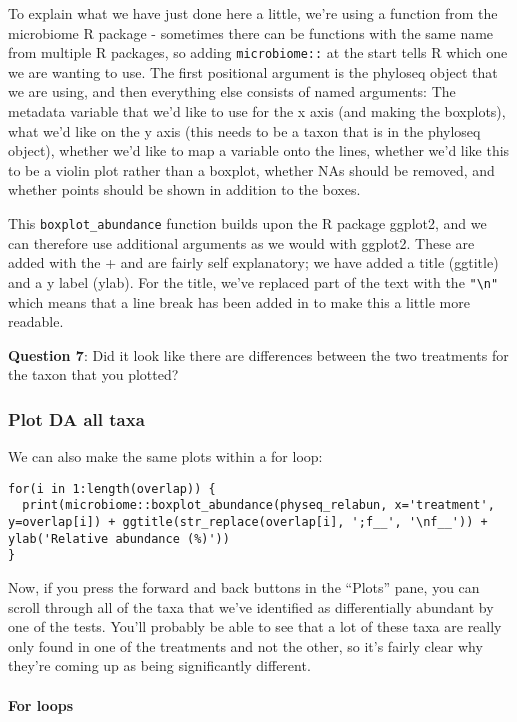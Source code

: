 \documentclass[
]{book}
\begin{document}
To explain what we have just done here a little, we're using a function from the microbiome R package - sometimes there can be functions with the same name from multiple R packages, so adding \texttt{microbiome::} at the start tells R which one we are wanting to use. The first positional argument is the phyloseq object that we are using, and then everything else consists of named arguments: The metadata variable that we'd like to use for the x axis (and making the boxplots), what we'd like on the y axis (this needs to be a taxon that is in the phyloseq object), whether we'd like to map a variable onto the lines, whether we'd like this to be a violin plot rather than a boxplot, whether NAs should be removed, and whether points should be shown in addition to the boxes.

This \texttt{boxplot\_abundance} function builds upon the R package ggplot2, and we can therefore use additional arguments as we would with ggplot2. These are added with the + and are fairly self explanatory; we have added a title (ggtitle) and a y label (ylab). For the title, we've replaced part of the text with the \texttt{"\textbackslash{}n"} which means that a line break has been added in to make this a little more readable.

\textbf{Question 7}: Did it look like there are differences between the two treatments for the taxon that you plotted?

\subsubsection{Plot DA all taxa}\label{plot-da-all-taxa}

We can also make the same plots within a for loop:

\begin{verbatim}
for(i in 1:length(overlap)) {
  print(microbiome::boxplot_abundance(physeq_relabun, x='treatment', y=overlap[i]) + ggtitle(str_replace(overlap[i], ';f__', '\nf__')) + ylab('Relative abundance (%)'))
}
\end{verbatim}

Now, if you press the forward and back buttons in the ``Plots'' pane, you can scroll through all of the taxa that we've identified as differentially abundant by one of the tests. You'll probably be able to see that a lot of these taxa are really only found in one of the treatments and not the other, so it's fairly clear why they're coming up as being significantly different.

\paragraph{For loops}\label{for-loops}
\end{document}
